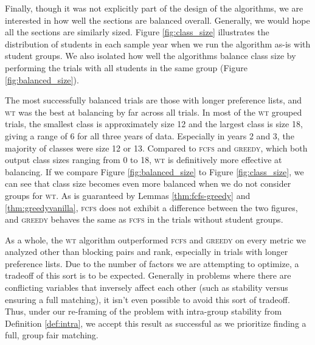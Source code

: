 Finally, though it was not explicitly part of the design of the algorithms, we are
interested in how well the sections are balanced overall.
Generally, we would hope all the sections are similarly sized. Figure
\ref{fig:class_size} illustrates the distribution of students in each sample
year when we run the algorithm as-is with student groups. We also isolated
how well the algorithms balance class size by performing the trials with all
students in the same group (Figure \ref{fig:balanced_size}).

The most successfully balanced trials are those with longer preference lists,
and \textsc{wt} was the best at balancing by far across all trials. In most of the
\textsc{wt} grouped trials, the smallest class is approximately size 12 and the largest class
is size 18, giving a range of 6 for all three years of data.
Especially in years 2 and 3, the majority of classes were size 12 or 13.
Compared to \textsc{fcfs} and \textsc{greedy}, which both output class sizes ranging
from 0 to 18, \textsc{wt} is definitively more effective at balancing. 
If we compare Figure \ref{fig:balanced_size} to Figure
\ref{fig:class_size}, we can see that class size becomes even more
balanced when we do not consider groups for \textsc{wt}. As is guaranteed by
Lemmas \ref{thm:fcfs-greedy} and \ref{thm:greedyvanilla}, \textsc{fcfs} does
not exhibit a difference between the two figures, and \textsc{greedy} behaves the
same as \textsc{fcfs} in the trials without student groups.  

As a whole, the \textsc{wt} algorithm outperformed \textsc{fcfs} and
\textsc{greedy} on every metric we analyzed other than blocking pairs and rank,
especially in trials with longer preference lists. Due to the number of factors
we are attempting to optimize, a tradeoff of this sort is to be expected.
Generally in problems where there are conflicting variables that inversely
affect each other (such as stability versus ensuring a full matching), it
isn't even possible to avoid this sort of tradeoff. Thus,
under our re-framing of the problem with intra-group stability from Definition
\ref{def:intra}, we accept this result as successful as we prioritize finding a
full, group fair matching. 

